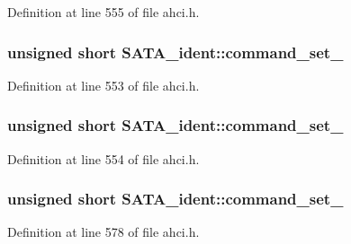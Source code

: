 Definition at line 555 of file ahci.\+h.

\subsubsection[{\texorpdfstring{command\+\_\+set\+\_\+1}{command_set_1}}]{\setlength{\rightskip}{0pt plus 5cm}unsigned short S\+A\+T\+A\+\_\+ident\+::command\+\_\+set\+\_}\hypertarget{structSATA__ident_af94e7c7a492cbcd4586315ffea27076a}{}\label{structSATA__ident_af94e7c7a492cbcd4586315ffea27076a}


Definition at line 553 of file ahci.\+h.

\subsubsection[{\texorpdfstring{command\+\_\+set\+\_\+2}{command_set_2}}]{\setlength{\rightskip}{0pt plus 5cm}unsigned short S\+A\+T\+A\+\_\+ident\+::command\+\_\+set\+\_}\hypertarget{structSATA__ident_a2392729304479e06e003afc3578b3b34}{}\label{structSATA__ident_a2392729304479e06e003afc3578b3b34}


Definition at line 554 of file ahci.\+h.

\subsubsection[{\texorpdfstring{command\+\_\+set\+\_\+3}{command_set_3}}]{\setlength{\rightskip}{0pt plus 5cm}unsigned short S\+A\+T\+A\+\_\+ident\+::command\+\_\+set\+\_}\hypertarget{structSATA__ident_a8e97ec892f9b34e03fd3e118232cb33d}{}\label{structSATA__ident_a8e97ec892f9b34e03fd3e118232cb33d}


Definition at line 578 of file ahci.\+h.

